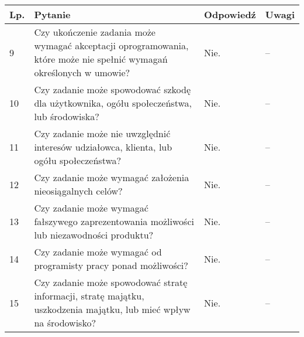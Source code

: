 \documentclass[11pt,oneside,a4paper,titlepage,onecolumn]{article}
\begin{document}
\begin{tabularx}{\textwidth}{|l|X|l|X|}
    \hline
    Lp. & Pytanie & Odpowiedź & Uwagi \\ \hline

	9
	& Czy ukończenie zadania może wymagać akceptacji oprogramowania, które może
    nie spełnić wymagań określonych w umowie?
	& Nie.
	& --
	\\\hline

	10
	& Czy zadanie może spowodować szkodę dla użytkownika, ogółu społeczeństwa, lub
    środowiska?
	& Nie.
	& --
	\\\hline

	11
	& Czy zadanie może nie uwzględnić interesów udziałowca, klienta, lub ogółu
    społeczeństwa?
	& Nie.
	& --
	\\\hline

	12
	& Czy zadanie może wymagać założenia nieosiągalnych celów?
	& Nie.
	& --
	\\\hline

	13
	& Czy zadanie może wymagać fałszywego zaprezentowania możliwości lub
    niezawodności produktu?
	& Nie.
	& --
	\\\hline

	14
	& Czy zadanie może wymagać od programisty pracy ponad możliwości?
	& Nie.
	& --
	\\\hline

	15
	& Czy zadanie może spowodować stratę informacji, stratę majątku, uszkodzenia
    majątku, lub mieć wpływ na środowisko?
	& Nie.
	& --
	\\\hline
\end{tabularx}
\end{document}

